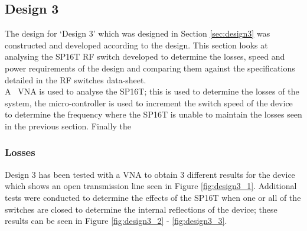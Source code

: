 \documentclass[12pt,openany,a4paper]{book}
\begin{document}
\subsection{Design 3}
The design for `Design 3' which was designed in Section \ref{sec:design3} was constructed and developed according to the design. This section looks at analysing the SP16T RF switch developed to determine the losses, speed and power requirements of the design and comparing them against the specifications detailed in the RF switches data-sheet.\\
A \model \ VNA is used to analyse the SP16T; this is used to determine the losses of the system, the micro-controller is used to increment the switch speed of the device to determine the frequency where the SP16T is unable to maintain the losses seen in the previous section. Finally the 
 
\subsubsection{Losses}
Design 3 has been tested with a VNA to obtain $3$ different results for the device which shows an open transmission line seen in Figure \ref{fig:design3_1}. Additional tests were conducted to determine the effects of the SP16T when one or all of the switches are closed to determine the internal reflections of the device; these results can be seen in Figure \ref{fig:design3_2} - \ref{fig:design3_3}. 
\end{document}
